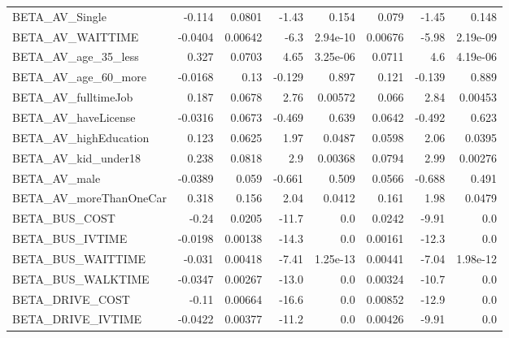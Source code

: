 \begin{tabular}{lrrrrrrr}
BETA\_AV\_Single               &   -0.114 &   0.0801 &   -1.43 &    0.154 &         0.079 &        -1.45 &         0.148 \\
BETA\_AV\_WAITTIME             &  -0.0404 &  0.00642 &    -6.3 & 2.94e-10 &       0.00676 &        -5.98 &      2.19e-09 \\
BETA\_AV\_age\_35\_less          &    0.327 &   0.0703 &    4.65 & 3.25e-06 &        0.0711 &          4.6 &      4.19e-06 \\
BETA\_AV\_age\_60\_more          &  -0.0168 &     0.13 &  -0.129 &    0.897 &         0.121 &       -0.139 &         0.889 \\
BETA\_AV\_fulltimeJob          &    0.187 &   0.0678 &    2.76 &  0.00572 &         0.066 &         2.84 &       0.00453 \\
BETA\_AV\_haveLicense          &  -0.0316 &   0.0673 &  -0.469 &    0.639 &        0.0642 &       -0.492 &         0.623 \\
BETA\_AV\_highEducation        &    0.123 &   0.0625 &    1.97 &   0.0487 &        0.0598 &         2.06 &        0.0395 \\
BETA\_AV\_kid\_under18          &    0.238 &   0.0818 &     2.9 &  0.00368 &        0.0794 &         2.99 &       0.00276 \\
BETA\_AV\_male                 &  -0.0389 &    0.059 &  -0.661 &    0.509 &        0.0566 &       -0.688 &         0.491 \\
BETA\_AV\_moreThanOneCar       &    0.318 &    0.156 &    2.04 &   0.0412 &         0.161 &         1.98 &        0.0479 \\
BETA\_BUS\_COST                &    -0.24 &   0.0205 &   -11.7 &      0.0 &        0.0242 &        -9.91 &           0.0 \\
BETA\_BUS\_IVTIME              &  -0.0198 &  0.00138 &   -14.3 &      0.0 &       0.00161 &        -12.3 &           0.0 \\
BETA\_BUS\_WAITTIME            &   -0.031 &  0.00418 &   -7.41 & 1.25e-13 &       0.00441 &        -7.04 &      1.98e-12 \\
BETA\_BUS\_WALKTIME            &  -0.0347 &  0.00267 &   -13.0 &      0.0 &       0.00324 &        -10.7 &           0.0 \\
BETA\_DRIVE\_COST              &    -0.11 &  0.00664 &   -16.6 &      0.0 &       0.00852 &        -12.9 &           0.0 \\
BETA\_DRIVE\_IVTIME            &  -0.0422 &  0.00377 &   -11.2 &      0.0 &       0.00426 &        -9.91 &           0.0 \\

\end{tabular}
